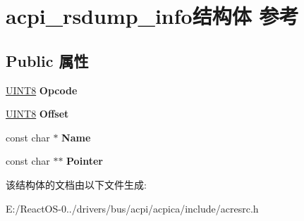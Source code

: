 \hypertarget{structacpi__rsdump__info}{}\section{acpi\+\_\+rsdump\+\_\+info结构体 参考}
\label{structacpi__rsdump__info}
\subsection*{Public 属性}
\begin{DoxyCompactItemize}
\item 
\mbox{\label{structacpi__rsdump__info_adc783823c778e7e1f9723387b737e167}} 
\hyperlink{_processor_bind_8h_ab27e9918b538ce9d8ca692479b375b6a}{U\+I\+N\+T8} {\bfseries Opcode}
\item 
\mbox{\label{structacpi__rsdump__info_ac83fb151c65eb7be4e1c30e079c22503}} 
\hyperlink{_processor_bind_8h_ab27e9918b538ce9d8ca692479b375b6a}{U\+I\+N\+T8} {\bfseries Offset}
\item 
\mbox{\label{structacpi__rsdump__info_a07591e52456bb18e19873f9396e46d00}} 
const char $\ast$ {\bfseries Name}
\item 
\mbox{\label{structacpi__rsdump__info_ab1290cc91f9de9ab7825902072d0e807}} 
const char $\ast$$\ast$ {\bfseries Pointer}
\end{DoxyCompactItemize}


该结构体的文档由以下文件生成\+:\begin{DoxyCompactItemize}
\item 
E\+:/\+React\+O\+S-\/0../drivers/bus/acpi/acpica/include/acresrc.\+h\end{DoxyCompactItemize}

